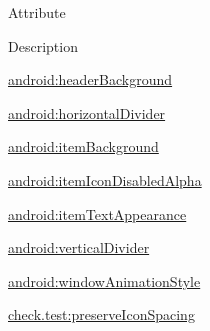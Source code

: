 Attribute

Description 

{\ttfamily \hyperlink{classcheck_1_1test_1_1_r_1_1styleable_a4e4a179bc404d7aa3f2a2a031b3637e3}{android\+:header\+Background}}

{\ttfamily \hyperlink{classcheck_1_1test_1_1_r_1_1styleable_a46412e274f28015595ca468aa91c144f}{android\+:horizontal\+Divider}}

{\ttfamily \hyperlink{classcheck_1_1test_1_1_r_1_1styleable_a33a367daf559b4bb77461ec037d3e86f}{android\+:item\+Background}}

{\ttfamily \hyperlink{classcheck_1_1test_1_1_r_1_1styleable_ac4582a310c88c18ea4a50f11ff473f68}{android\+:item\+Icon\+Disabled\+Alpha}}

{\ttfamily \hyperlink{classcheck_1_1test_1_1_r_1_1styleable_ad1f162a33f4a61b0900eb474fd824ddb}{android\+:item\+Text\+Appearance}}

{\ttfamily \hyperlink{classcheck_1_1test_1_1_r_1_1styleable_a32c0f0f19e2ec8e866a3c03c63f95680}{android\+:vertical\+Divider}}

{\ttfamily \hyperlink{classcheck_1_1test_1_1_r_1_1styleable_ada6890b4f29ec20b02e8c982e454986d}{android\+:window\+Animation\+Style}}

{\ttfamily \hyperlink{classcheck_1_1test_1_1_r_1_1styleable_ad1b55b20b2ab6b61d05dd41ed2312ff2}{check.\+test\+:preserve\+Icon\+Spacing}}

